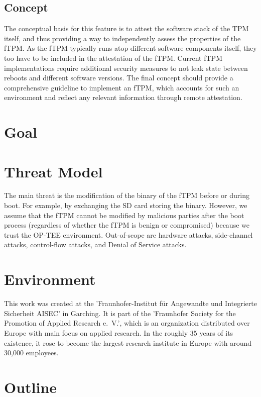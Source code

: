 \subsection{Concept}
The conceptual basis for this feature is to attest the software stack of the TPM itself, and thus providing a way to independently assess the properties of the fTPM.
As the fTPM typically runs atop different software components itself, they too have to be included in the attestation of the fTPM.
Current fTPM implementations require additional security measures to not leak state between reboots and different software versions.
The final concept should provide a comprehensive guideline to implement an fTPM, which accounts for such an environment and reflect any relevant information through remote attestation.

\section{Goal}
\section{Threat Model}

The main threat is the modification of the binary of the fTPM before or during boot. For example, by exchanging the SD card storing the binary.
However, we assume that the fTPM cannot be modified by malicious parties after the boot process (regardless of whether the fTPM is benign or compromised) because we trust the OP-TEE environment.
Out-of-scope are hardware attacks, side-channel attacks, control-flow attacks, and Denial of Service attacks.



\section{Environment}

This work was created at the 'Fraunhofer-Institut für Angewandte und Integrierte Sicherheit AISEC' in Garching.
It is part of the 'Fraunhofer Society for the Promotion of Applied Research e.~V.', which is an organization distributed over Europe with main focus on applied research.
In the roughly 35 years of its existence, it rose to become the largest research institute in Europe with around 30,000 employees.

\section{Outline}
